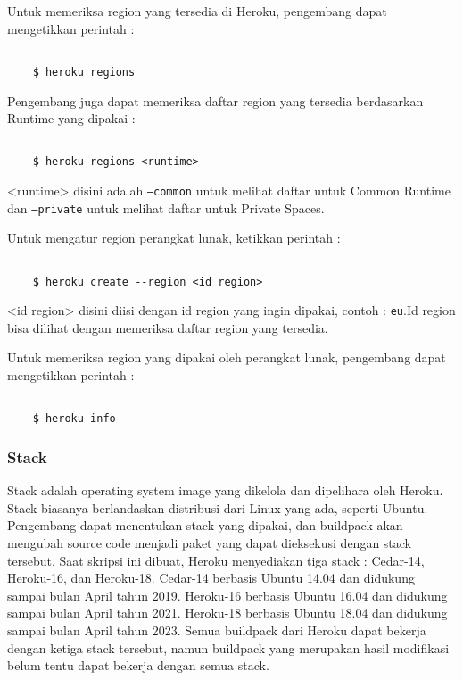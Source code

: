 Untuk memeriksa region yang tersedia di Heroku, pengembang dapat mengetikkan perintah :
\begin{lstlisting}

	$ heroku regions

\end{lstlisting}

Pengembang juga dapat memeriksa daftar region yang tersedia berdasarkan Runtime yang dipakai :
\begin{lstlisting}

	$ heroku regions <runtime>

\end{lstlisting}
<runtime> disini adalah \texttt{--common} untuk melihat daftar untuk Common Runtime dan \texttt{--private} untuk melihat daftar untuk Private Spaces.

Untuk mengatur region perangkat lunak, ketikkan perintah :
\begin{lstlisting}

	$ heroku create --region <id region>

\end{lstlisting}
<id region> disini diisi dengan id region yang ingin dipakai, contoh : \texttt{eu}.Id region bisa dilihat dengan memeriksa daftar region yang tersedia.

Untuk memeriksa region yang dipakai oleh perangkat lunak, pengembang dapat mengetikkan perintah :
\begin{lstlisting}

	$ heroku info

\end{lstlisting}


\subsubsection{Stack}
Stack adalah operating system image yang dikelola dan dipelihara oleh Heroku. Stack biasanya berlandaskan distribusi dari Linux yang ada, seperti Ubuntu. Pengembang dapat menentukan stack yang dipakai, dan buildpack akan mengubah source code menjadi paket yang dapat dieksekusi dengan stack tersebut. Saat skripsi ini dibuat, Heroku menyediakan tiga stack : Cedar-14, Heroku-16, dan Heroku-18. Cedar-14 berbasis Ubuntu 14.04 dan didukung sampai bulan April tahun 2019. Heroku-16 berbasis Ubuntu 16.04 dan didukung sampai bulan April tahun 2021. Heroku-18 berbasis Ubuntu 18.04 dan didukung sampai bulan April tahun 2023. Semua buildpack dari Heroku dapat bekerja dengan ketiga stack tersebut, namun buildpack yang merupakan hasil modifikasi belum tentu dapat bekerja dengan semua stack.

